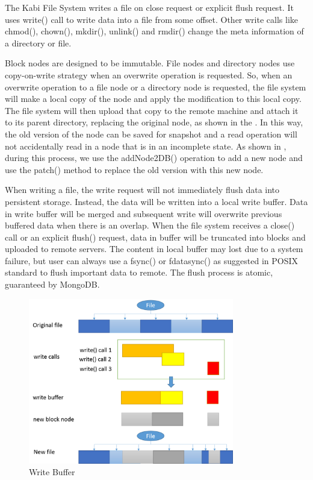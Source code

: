     The Kabi File System writes a file on close request or explicit flush request. It uses write() call to write data into a file from some offset. Other write calls like chmod(), chown(), mkdir(), unlink() and rmdir() change the meta information of a directory or file.

    Block nodes are designed to be immutable. File nodes and directory nodes use copy-on-write strategy when an overwrite operation is requested. So, when an overwrite operation to a file node or a directory node is requested, the file system will make a local copy of the node and apply the modification to this local copy. The file system will then upload that copy to the remote machine and attach it to its parent directory, replacing the original node, as shown in the . In this way, the old version of the node can be saved for snapshot and a read operation will not accidentally read in a node that is in an incomplete state. As shown in , during this process, we use the addNode2DB() operation to add a new node and use the patch() method to replace the old version with this new node.

	When writing a file, the write request will not immediately flush data into persistent storage. Instead, the data will be written into a local write buffer. Data in write buffer will be merged and subsequent write will overwrite previous buffered data when there is an overlap. When the file system receives a close() call or an explicit flush() request, data in buffer will be truncated into blocks and uploaded to remote servers. The content in local buffer may lost due to a system failure, but user can always use a fsync() or fdatasync() as suggested in POSIX standard to flush important data to remote. The flush process is atomic, guaranteed by MongoDB. 

\begin{figure}[t]
\centering
\includegraphics[width=0.8\textwidth]{Chapter-3/figs/fig11.png}
\caption{Write Buffer}
\label{fig:buffer}
\end{figure}

